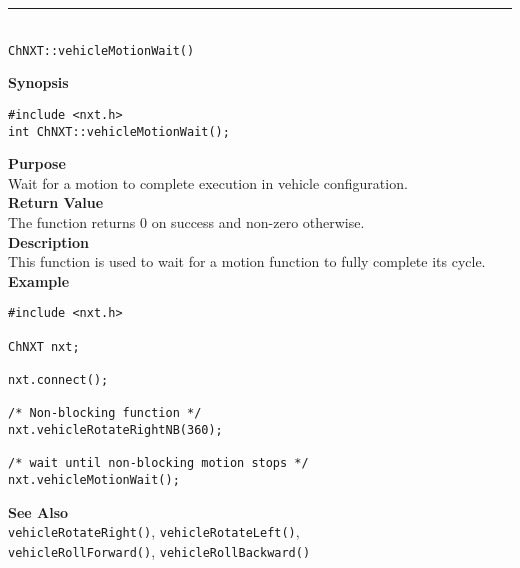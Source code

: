 \noindent
\vspace{5pt}
\rule{4.5in}{0.015in}\\
\noindent
{\LARGE \texttt{ChNXT::vehicleMotionWait()}}\\
{}

\noindent
{\bf Synopsis}
\vspace{-8pt}
\begin{verbatim}
#include <nxt.h>
int ChNXT::vehicleMotionWait();
\end{verbatim}

\noindent
{\bf Purpose}\\
Wait for a motion to complete execution in vehicle configuration.\\

\noindent
{\bf Return Value}\\
The function returns 0 on success and non-zero otherwise.\\

\noindent
{\bf Description}\\
This function is used to wait for a motion function to fully complete its cycle.\\


\noindent
{\bf Example}\\
\begin{verbatim}
#include <nxt.h>

ChNXT nxt;

nxt.connect();

/* Non-blocking function */
nxt.vehicleRotateRightNB(360);

/* wait until non-blocking motion stops */
nxt.vehicleMotionWait();
\end{verbatim}

\noindent
{\bf See Also}\\
\texttt{vehicleRotateRight()}, \texttt{vehicleRotateLeft()}, \\
\texttt{vehicleRollForward()}, \texttt{vehicleRollBackward()}



